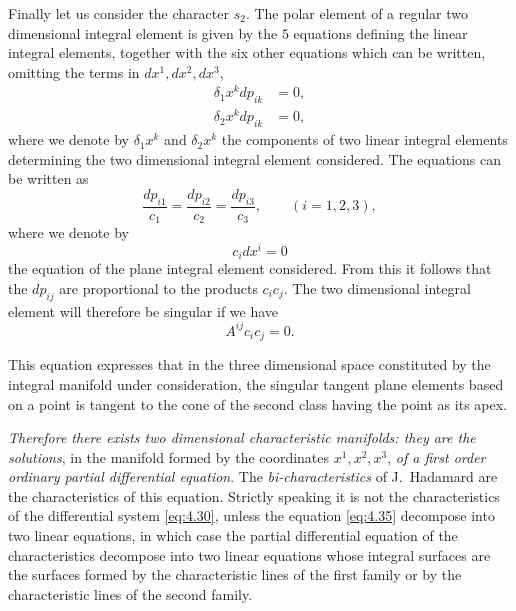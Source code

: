 Finally let us consider the character $s_{2}$. The polar element of a regular two dimensional integral element is given by the $5$ equations defining the linear integral elements, together with the six other equations which can be written, omitting the terms in $dx^{1},dx^{2},dx^{3}$,
\begin{align*}
  \delta_{1}x^{k}dp_{ik}&=0,\\
  \delta_{2}x^{k}dp_{ik}&=0,
\end{align*}
where we denote by $\delta_{1}x^{k}$ and $\delta_{2}x^{k}$ the components of two linear integral elements determining the two dimensional integral element considered. The equations can be written as
\[
\frac{dp_{i1}}{c_{1}}=\frac{dp_{i2}}{c_{2}}=\frac{dp_{i3}}{c_{3}},\qquad(i=1,2,3),
\]
where we denote by 
\[
c_{i}dx^{i}=0
\]
the equation of the plane integral element considered. From this it follows that the $dp_{ij}$ are proportional to the products $c_{i}c_{j}$. The two dimensional integral element will therefore be singular if we have
\begin{equation}
  \label{eq:4.35}
  A^{ij}c_{i}c_{j}=0.
\end{equation}

This equation expresses that in the three dimensional space constituted by the integral manifold under consideration, the singular tangent plane elements based on a point is tangent to the cone of the second class having the point as its apex.

\emph{Therefore there exists two dimensional characteristic manifolds: they are the solutions}, in the manifold formed by the coordinates $x^{1},x^{2},x^{3}$, \emph{of a first order ordinary partial differential equation}. The \emph{bi-characteristics} of J.~Hadamard are the characteristics of this equation. Strictly speaking it is not the characteristics of the differential system \eqref{eq:4.30}, unless the equation \eqref{eq:4.35} decompose into two linear equations, in which case the partial differential equation of the characteristics decompose into two linear equations whose integral surfaces are the surfaces formed  by the characteristic lines of the first family or by the characteristic lines of the second family.

